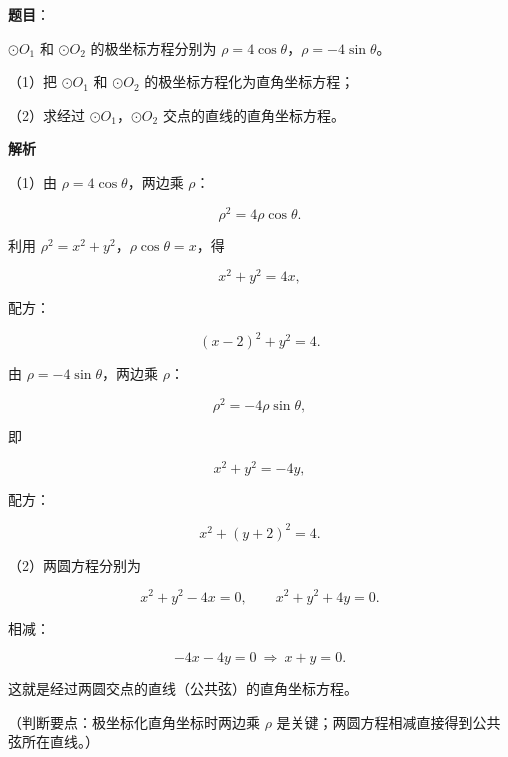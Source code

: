 \begin{answer}

\textbf{题目}：

$\odot O_1$ 和 $\odot O_2$ 的极坐标方程分别为 $\rho=4\cos\theta$，$\rho=-4\sin\theta$。

（1）把 $\odot O_1$ 和 $\odot O_2$ 的极坐标方程化为直角坐标方程；

（2）求经过 $\odot O_1$，$\odot O_2$ 交点的直线的直角坐标方程。

\textbf{解析}

（1）由 $\rho=4\cos\theta$，两边乘 $\rho$：

\nopagebreak[4]
\[\rho^2=4\rho\cos\theta.\]

利用 $\rho^2=x^2+y^2$，$\rho\cos\theta=x$，得

\nopagebreak[4]
\[x^2+y^2=4x,\]

配方：

\nopagebreak[4]
\[(x-2)^2+y^2=4.\]

由 $\rho=-4\sin\theta$，两边乘 $\rho$：

\nopagebreak[4]
\[\rho^2=-4\rho\sin\theta,\]

即

\nopagebreak[4]
\[x^2+y^2=-4y,\]

配方：

\nopagebreak[4]
\[x^2+(y+2)^2=4.\]

（2）两圆方程分别为

\nopagebreak[4]
\[x^2+y^2-4x=0,\qquad x^2+y^2+4y=0.\]

相减：

\nopagebreak[4]
\[-4x-4y=0\ \Rightarrow\ x+y=0.\]

这就是经过两圆交点的直线（公共弦）的直角坐标方程。

（判断要点：极坐标化直角坐标时两边乘 $\rho$ 是关键；两圆方程相减直接得到公共弦所在直线。）


\end{answer}
